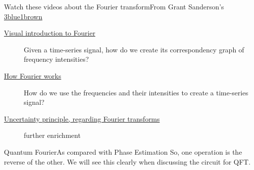 \begin{frame}{Watch these videos about the Fourier transform}{From Grant Sanderson's \href{https://www.3blue1brown.com/}{3blue1brown}}

\begin{description}
    \item[\href{https://www.youtube.com/watch?v=spUNpyF58BY}{Visual introduction to Fourier}]  Given a time-series signal, how do we create its correspondency graph of frequency intensities?
    \item[\href{https://www.youtube.com/watch?v=r6sGWTCMz2k}{How Fourier works}]  How do we use the frequencies and their intensities to create a time-series signal?
    \item[\href{https://www.youtube.com/watch?v=MBnnXbOM5S4}{Uncertainty principle, regarding Fourier transforms}]  further enrichment
\end{description}
    
\end{frame}


\begin{frame}{Quantum Fourier}{As compared with Phase Estimation}
%
\BigSkip{}
So, one operation is the reverse of the other.  We will see this clearly when discussing the circuit for QFT.
\end{frame}


